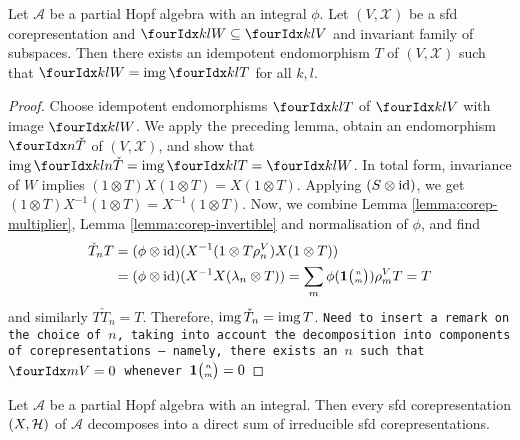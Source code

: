 
\begin{Lem}
  Let $\mathscr{A}$ be a partial Hopf algebra with an integral $\phi$.
  Let $(V,\mathscr{X})$ be a sfd corepresentation and $\Gru{W}{k}{l}
  \subseteq \Gru{V}{k}{l}$ and invariant family of subspaces. Then
  there exists an idempotent endomorphism $T$  of $(V,\mathscr{X})$
  such that $\Gru{W}{k}{l}=\img\Gru{T}{k}{l}$ for all $k,l$. 
\end{Lem}
\begin{proof}
  Choose idempotent endomorphisms $\Gru{T}{k}{l}$ of $\Gru{V}{k}{l}$
  with image $\Gru{W}{k}{l}$. We apply the preceding lemma, obtain an
  endomorphism $\Grd{\check{T}}{}{n}$ of $(V,\mathscr{X})$, and show
  that $\img \Gr{\check{T}}{k}{l}{}{n} = \img\Gru{T}{k}{l}= \Gru{W}{k}{l}$.   In
  total form, invariance of $W$ implies  $(1 \otimes T)X(1
  \otimes T)=X(1\otimes T)$. Applying
 $(S \otimes \operatorname{id})$, we get   $(1 \otimes T)X^{-1}(1
  \otimes T)=X^{-1}(1\otimes T)$.
Now, we combine  Lemma
  \ref{lemma:corep-multiplier}, Lemma \ref{lemma:corep-invertible} and
  normalisation of $\phi$, and find
  \begin{align*}
    \check{T}_{n} T &= (\phi \otimes \operatorname{id})(X^{-1}(1 \otimes
    T\rho_{n}^{V})X(1 \otimes T)) \\ &=
(\phi \otimes \operatorname{id})(X^{-1}X(\lambda_{n} \otimes T))
 = \sum_{m} \phi(\mathbf{1}{\tiny {\begin{pmatrix} n\\m\end{pmatrix}}}) \rho^{V}_{m}T =T
  \end{align*}
  and similarly $T\check{T}_{n}=T$. Therefore,
  $\operatorname{img}{\check{T}_{n}}=\operatorname{img} T$. \texttt{Need to insert a remark on the
  choice of $n$, taking into account the decomposition into components
of corepresentations --- namely, there exists an $n$ such that
$\Gru{V}{}{m}=0$ whenever $\mathbf{1}{\tiny {\begin{pmatrix} n\\m\end{pmatrix}}}=0$}
\end{proof}
\begin{Prop} 
  Let $\mathscr{A}$ be a partial Hopf algebra with an integral.  Then
  every sfd corepresentation $(X,\mathcal{H})$ of $\mathscr{A}$ decomposes
  into a direct sum of irreducible sfd corepresentations.
\end{Prop} 
